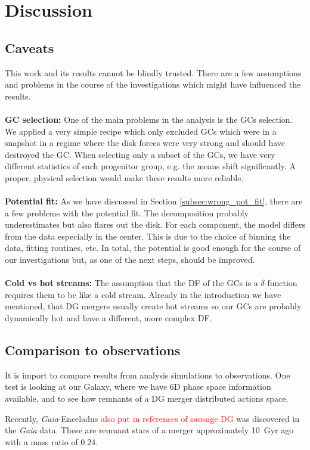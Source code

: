 \section{Discussion} \label{sec:Discussion}
\subsection{Caveats}
This work and its results cannot be blindly trusted. There are a few assumptions and problems in the course of the investigations which might have influenced the results.
\\\\\textbf{GC selection:}
One of the main problems in the analysis is the \acp{GC} selection. We applied a very simple recipe which only excluded \acp{GC} which were in a snapshot in a regime where the disk forces were very strong and should have destroyed the \ac{GC}. When selecting only a subset of the \acp{GC}, we have very different statistics of each progenitor group, e.g. the means shift significantly. A proper, physical selection would make these results more reliable. 
\\\\\textbf{Potential fit:}
As we have discussed in Section \ref{subsec:wrong_pot_fit}, there are a few problems with the potential fit. The decomposition probably underestimates but also flares out the disk. For each component, the model differs from the data especially in the center. This is due to the choice of binning the data, fitting routines, etc. In total, the potential is good enough for the course of our investigations but, as one of the next steps, should be improved.
\\\\\textbf{Cold vs hot streams:}
The assumption that the \ac{DF} of the \acp{GC} is a $\delta$-function requires them to be like a cold stream. Already in the introduction we have mentioned, that \ac{DG} mergers usually create hot streams so our \acp{GC} are probably dynamically hot and have a different, more complex \ac{DF}.
\textbf{}
\subsection{Comparison to observations}
It is import to compare results from analysis simulations to observations. One test is looking at our Galaxy, where we have 6D phase space information available, and to see how remnants of a \ac{DG} merger distributed actions space.

Recently, \textit{Gaia}-Enceladus \citep{Enceladus....Helmi...2018} \textcolor{red}{also put in references of sausage DG} was discovered in the \textit{Gaia} data. These are remnant stars of a merger approximately \SI{10}{Gyr} ago with a mass ratio of 0.24. 

